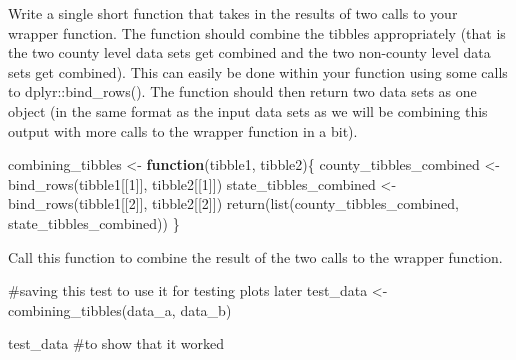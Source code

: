 \documentclass[
  letterpaper,
  DIV=11,
  numbers=noendperiod]{scrartcl}
\newenvironment{Shaded}{\begin{snugshade}}{\end{snugshade}}
\newcommand{\CommentTok}[1]{\textcolor[rgb]{0.37,0.37,0.37}{#1}}
\newcommand{\ControlFlowTok}[1]{\textcolor[rgb]{0.00,0.23,0.31}{\textbf{#1}}}
\newcommand{\DecValTok}[1]{\textcolor[rgb]{0.68,0.00,0.00}{#1}}
\newcommand{\FunctionTok}[1]{\textcolor[rgb]{0.28,0.35,0.67}{#1}}
\newcommand{\NormalTok}[1]{\textcolor[rgb]{0.00,0.23,0.31}{#1}}
\newcommand{\OtherTok}[1]{\textcolor[rgb]{0.00,0.23,0.31}{#1}}
\begin{document}
Write a single short function that takes in the results of two calls to
your wrapper function. The function should combine the tibbles
appropriately (that is the two county level data sets get combined and
the two non-county level data sets get combined). This can easily be
done within your function using some calls to dplyr::bind\_rows(). The
function should then return two data sets as one object (in the same
format as the input data sets as we will be combining this output with
more calls to the wrapper function in a bit).

\begin{Shaded}
\begin{Highlighting}[]
\NormalTok{combining\_tibbles }\OtherTok{\textless{}{-}} \ControlFlowTok{function}\NormalTok{(tibble1, tibble2)\{}
\NormalTok{  county\_tibbles\_combined }\OtherTok{\textless{}{-}} \FunctionTok{bind\_rows}\NormalTok{(tibble1[[}\DecValTok{1}\NormalTok{]], tibble2[[}\DecValTok{1}\NormalTok{]])}
\NormalTok{  state\_tibbles\_combined }\OtherTok{\textless{}{-}} \FunctionTok{bind\_rows}\NormalTok{(tibble1[[}\DecValTok{2}\NormalTok{]], tibble2[[}\DecValTok{2}\NormalTok{]])}
  \FunctionTok{return}\NormalTok{(}\FunctionTok{list}\NormalTok{(county\_tibbles\_combined, state\_tibbles\_combined))}
\NormalTok{\}}
\end{Highlighting}
\end{Shaded}

Call this function to combine the result of the two calls to the wrapper
function.

\begin{Shaded}
\begin{Highlighting}[]
\CommentTok{\#saving this test to use it for testing plots later }
\NormalTok{test\_data }\OtherTok{\textless{}{-}} \FunctionTok{combining\_tibbles}\NormalTok{(data\_a, data\_b)}

\NormalTok{test\_data }\CommentTok{\#to show that it worked }
\end{Highlighting}
\end{Shaded}
\end{document}
